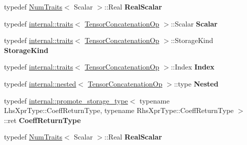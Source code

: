 \begin{DoxyCompactItemize}
typedef \hyperlink{group___core___module_struct_eigen_1_1_num_traits}{Num\+Traits}$<$ Scalar $>$\+::Real {\bfseries Real\+Scalar}
\item 
\mbox{\label{class_eigen_1_1_tensor_concatenation_op_ab6168dbb30bf57f40cfe9953fa255fee}} 
typedef \hyperlink{struct_eigen_1_1internal_1_1traits}{internal\+::traits}$<$ \hyperlink{class_eigen_1_1_tensor_concatenation_op}{Tensor\+Concatenation\+Op} $>$\+::Scalar {\bfseries Scalar}
\item 
\mbox{\label{class_eigen_1_1_tensor_concatenation_op_a0b5672d304832d232cb421ece668290f}} 
typedef \hyperlink{struct_eigen_1_1internal_1_1traits}{internal\+::traits}$<$ \hyperlink{class_eigen_1_1_tensor_concatenation_op}{Tensor\+Concatenation\+Op} $>$\+::Storage\+Kind {\bfseries Storage\+Kind}
\item 
\mbox{\label{class_eigen_1_1_tensor_concatenation_op_a72164848fbcaab6670bd33aa605418ac}} 
typedef \hyperlink{struct_eigen_1_1internal_1_1traits}{internal\+::traits}$<$ \hyperlink{class_eigen_1_1_tensor_concatenation_op}{Tensor\+Concatenation\+Op} $>$\+::Index {\bfseries Index}
\item 
\mbox{\label{class_eigen_1_1_tensor_concatenation_op_a4d5fc215747e4838c724be67dbd18993}} 
typedef \hyperlink{struct_eigen_1_1internal_1_1nested}{internal\+::nested}$<$ \hyperlink{class_eigen_1_1_tensor_concatenation_op}{Tensor\+Concatenation\+Op} $>$\+::type {\bfseries Nested}
\item 
\mbox{\label{class_eigen_1_1_tensor_concatenation_op_ab8588a7cd2279fbdcdf3780b4529ff35}} 
typedef \hyperlink{struct_eigen_1_1internal_1_1promote__storage__type}{internal\+::promote\+\_\+storage\+\_\+type}$<$ typename Lhs\+Xpr\+Type\+::\+Coeff\+Return\+Type, typename Rhs\+Xpr\+Type\+::\+Coeff\+Return\+Type $>$\+::ret {\bfseries Coeff\+Return\+Type}
\item 
\mbox{\label{class_eigen_1_1_tensor_concatenation_op_a884f426dfd66a809b7ffec0781935648}} 
typedef \hyperlink{group___core___module_struct_eigen_1_1_num_traits}{Num\+Traits}$<$ Scalar $>$\+::Real {\bfseries Real\+Scalar}
\end{DoxyCompactItemize}
